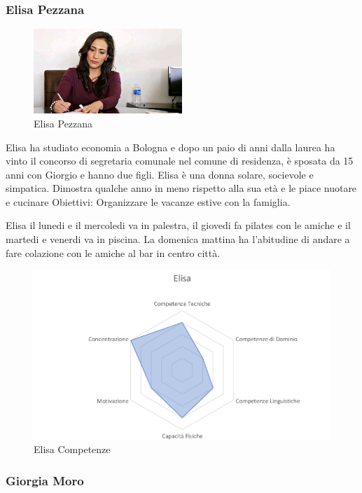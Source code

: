 \documentclass[12pt,italian,]{report}
\begin{document}
\hypertarget{elisa-pezzana-1}{%
\subsubsection{Elisa Pezzana}\label{elisa-pezzana-1}}

\begin{figure}[h]
\centering
\includegraphics[width=0.5\textwidth,height=\textheight]{img/elisa.jpg}
\caption{Elisa Pezzana}
\end{figure}

Elisa ha studiato economia a Bologna e dopo un paio di anni dalla laurea
ha vinto il concorso di segretaria comunale nel comune di residenza, è
sposata da 15 anni con Giorgio e hanno due figli. Elisa è una donna
solare, socievole e simpatica. Dimostra qualche anno in meno rispetto
alla sua età e le piace nuotare e cucinare Obiettivi: Organizzare le
vacanze estive con la famiglia.

Elisa il lunedi e il mercoledi va in palestra, il giovedi fa pilates con
le amiche e il martedi e venerdi va in piscina. La domenica mattina ha
l'abitudine di andare a fare colazione con le amiche al bar in centro
città.

\begin{figure}[h]
\centering
\includegraphics{img/elisa_competenze.png}
\caption{Elisa Competenze}
\end{figure}

\hypertarget{giorgia-moro-1}{%
\subsubsection{Giorgia Moro}\label{giorgia-moro-1}}
\end{document}
